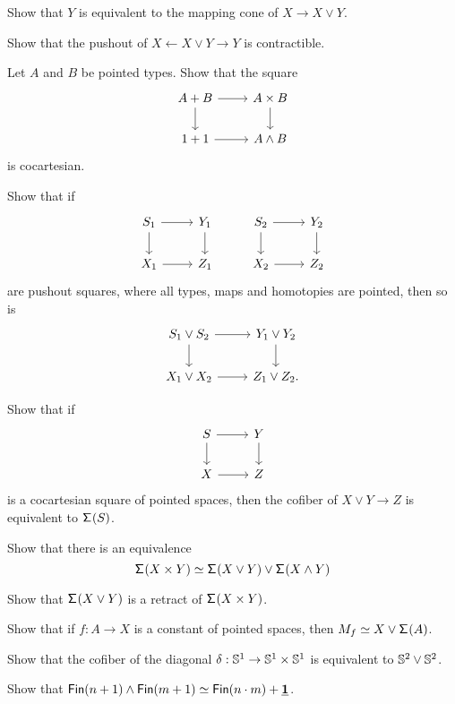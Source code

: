 \begin{exercises}
\item 
\begin{subexenum}
\item Show that $Y$ is equivalent to the mapping cone of $X\to X\vee Y$.
\item Show that the pushout of $X \leftarrow X\vee Y \rightarrow Y$ is contractible.
\end{subexenum}
\item Let $A$ and $B$ be pointed types. Show that the square
\begin{equation*}
\begin{tikzcd}
A+B \arrow[r] \arrow[d] & A\times B \arrow[d] \\
1+1 \arrow[r] & A\wedge B
\end{tikzcd}
\end{equation*}
is cocartesian.
\item Show that if
\begin{equation*}
\begin{tikzcd}
S_1 \arrow[r] \arrow[d] & Y_1 \arrow[d] & S_2 \arrow[r] \arrow[d] & Y_2 \arrow[d] \\
X_1 \arrow[r] & Z_1 & X_2 \arrow[r] & Z_2
\end{tikzcd}
\end{equation*}
are pushout squares, where all types, maps and homotopies are pointed, then so is
\begin{equation*}
\begin{tikzcd}
S_1\vee S_2 \arrow[r] \arrow[d] & Y_1\vee Y_2 \arrow[d] \\
X_1 \vee X_2 \arrow[r] & Z_1\vee Z_2. 
\end{tikzcd}
\end{equation*}
\item Show that if
\begin{equation*}
\begin{tikzcd}
S \arrow[r] \arrow[d] & Y \arrow[d] \\
X \arrow[r] & Z
\end{tikzcd}
\end{equation*}
is a cocartesian square of pointed spaces, then the cofiber of $X\vee Y\to Z$ is equivalent to $\mathsf{\Sigma}^{}(S)$.
\item Show that there is an equivalence
\begin{equation*}
\eqv{\susp(X\times Y)}{\susp(X\vee Y)\vee \susp(X\wedge Y)}
\end{equation*}
\item Show that $\mathsf{\Sigma}^{}(X\vee Y)$ is a retract of $\mathsf{\Sigma}^{}(X\times Y)$. 
\item Show that if $f:A\to X$ is a constant of pointed spaces, then $\eqv{M_f}{X\vee \susp(A)}$. 
\item Show that the cofiber of the diagonal $\delta:\mathbb{S}^{1}\to \mathbb{S}^{1}\times\mathbb{S}^{1}$ is equivalent to $\mathbb{S}^{2}\vee\mathbb{S}^{2}$.
\item Show that $\eqv{\mathsf{Fin}(n+1)\wedge \mathsf{Fin}(m+1)}{\mathsf{Fin}(n\cdot m)+\unit}$.
\end{exercises}

